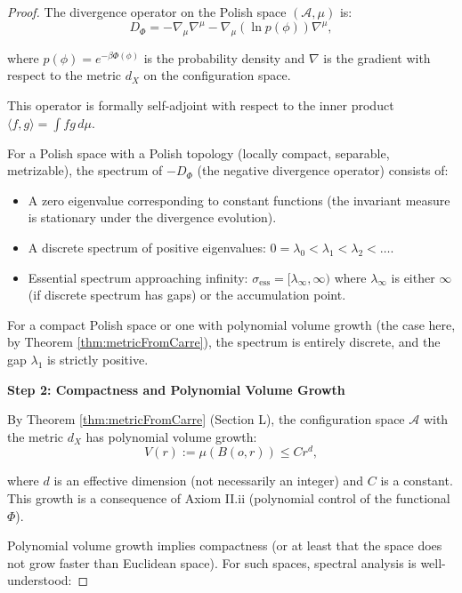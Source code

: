 \begin{lemma}
\begin{proof}
The divergence operator on the Polish space $(\mathcal{A}, \mu)$ is:
\begin{equation}
D_\Phi = -\nabla_\mu \nabla^\mu - \nabla_\mu (\ln p(\phi)) \nabla^\mu,
\end{equation}

where $p(\phi) = e^{-\beta \Phi(\phi)}$ is the probability density and $\nabla$ is the gradient with respect to the metric $d_X$ on the configuration space.

This operator is formally self-adjoint with respect to the inner product $\langle f, g \rangle = \int f g \, d\mu$.

For a Polish space with a Polish topology (locally compact, separable, metrizable), the spectrum of $-D_\Phi$ (the negative divergence operator) consists of:

\begin{itemize}

\item A zero eigenvalue corresponding to constant functions (the invariant measure is stationary under the divergence evolution).

\item A discrete spectrum of positive eigenvalues: $0 = \lambda_0 < \lambda_1 < \lambda_2 < \ldots$.

\item Essential spectrum approaching infinity: $\sigma_{\text{ess}} = [\lambda_\infty, \infty)$ where $\lambda_\infty$ is either $\infty$ (if discrete spectrum has gaps) or the accumulation point.

\end{itemize}

For a compact Polish space or one with polynomial volume growth (the case here, by Theorem \ref{thm:metricFromCarre}), the spectrum is entirely discrete, and the gap $\lambda_1$ is strictly positive.

\textbf{Step 2: Compactness and Polynomial Volume Growth}

By Theorem \ref{thm:metricFromCarre} (Section L), the configuration space $\mathcal{A}$ with the metric $d_X$ has polynomial volume growth:
\begin{equation}
V(r) := \mu(B(o, r)) \leq C r^d,
\end{equation}

where $d$ is an effective dimension (not necessarily an integer) and $C$ is a constant. This growth is a consequence of Axiom II.ii (polynomial control of the functional $\Phi$).

Polynomial volume growth implies compactness (or at least that the space does not grow faster than Euclidean space). For such spaces, spectral analysis is well-understood:


\end{proof}
\end{lemma}
